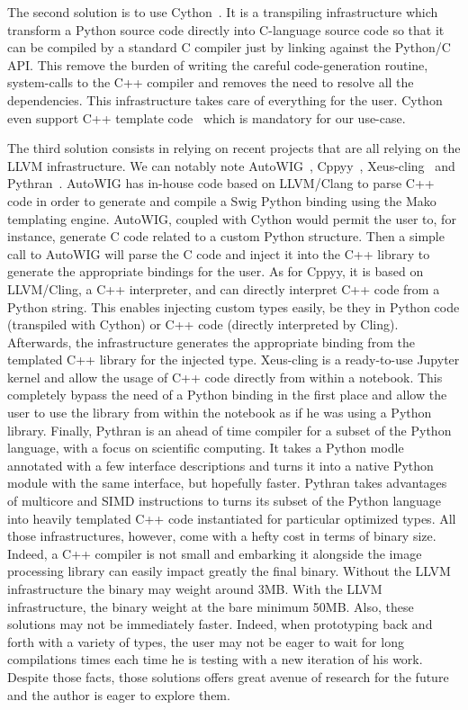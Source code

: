 The second solution is to use Cython~\parencite{behnel.2010.cython}. It is a transpiling infrastructure which transform
a Python source code directly into C-language source code so that it can be compiled by a standard C compiler just by
linking against the Python/C API. This remove the burden of writing the careful code-generation routine, system-calls to
the C++ compiler and removes the need to resolve all the dependencies. This infrastructure takes care of everything for
the user. Cython even support C++ template code~\parencite{behnel.2022.cython-template} which is mandatory for our
use-case.

The third solution consists in relying on recent projects that are all relying on the LLVM infrastructure. We can
notably note AutoWIG~\parencite{fernique.2018.autowig}, Cppyy~\parencite{wimtlplavrijsen.2016.cppyy},
Xeus-cling~\parencite{quantstack.2021.xeus-cling} and Pythran~\parencite{guelton.2015.pythran}. AutoWIG has in-house
code based on LLVM/Clang to parse C++ code in order to generate and compile a Swig Python binding using the Mako
templating engine. AutoWIG, coupled with Cython would permit the user to, for instance, generate C code related to a
custom Python structure. Then a simple call to AutoWIG will parse the C code and inject it into the C++ library to
generate the appropriate bindings for the user. As for Cppyy, it is based on LLVM/Cling, a C++ interpreter, and can
directly interpret C++ code from a Python string. This enables injecting custom types easily, be they in Python code
(transpiled with Cython) or C++ code (directly interpreted by Cling). Afterwards, the infrastructure generates the
appropriate binding from the templated C++ library for the injected type. Xeus-cling is a ready-to-use Jupyter kernel
and allow the usage of C++ code directly from within a notebook. This completely bypass the need of a Python binding in
the first place and allow the user to use the library from within the notebook as if he was using a Python library.
Finally, Pythran is an ahead of time compiler for a subset of the Python language, with a focus on scientific computing.
It takes a Python modle annotated with a few interface descriptions and turns it into a native Python module with the
same interface, but hopefully faster. Pythran takes advantages of multicore and SIMD instructions to turns its subset of
the Python language into heavily templated C++ code instantiated for particular optimized types. All those
infrastructures, however, come with a hefty cost in terms of binary size. Indeed, a C++ compiler is not small and
embarking it alongside the image processing library can easily impact greatly the final binary. Without the LLVM
infrastructure the binary may weight around 3MB. With the LLVM infrastructure, the binary weight at the bare minimum
50MB. Also, these solutions may not be immediately faster. Indeed, when prototyping back and forth with a variety of
types, the user may not be eager to wait for long compilations times each time he is testing with a new iteration of his
work. Despite those facts, those solutions offers great avenue of research for the future and the author is eager to
explore them.


